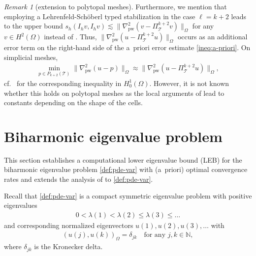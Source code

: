 \documentclass[a4paper]{amsart}
\numberwithin{equation}{section}
\def\pw{\mathrm{pw}}
\theoremstyle{definition}
\theoremstyle{remark}
\newtheorem{remark}[theorem]{Remark}
\numberwithin{theorem}{section}
\numberwithin{equation}{section}
\numberwithin{table}{section}
\numberwithin{figure}{section}
\begin{document}
\begin{remark}[extension to polytopal meshes]
    Furthermore, we mention that employing a Lehrenfeld-Sch\"oberl typed stabilization in the case $\ell = k+2$ leads to the upper bound $s_h(I_h v, I_h v) \lesssim \|\nabla_\pw^2(v - \Pi_{\mathcal{T}}^{k+2} v)\|_{\Omega}$ for any $v \in H^2(\Omega)$ instead of . Thus, $\|\nabla_\pw^2(u - \Pi_{\mathcal{T}}^{k+2} u)\|_{\Omega}$ occurs as an additional error term on the right-hand side of the a~priori error estimate \eqref{ineq:a-priori}. On simplicial meshes,
    \begin{align*}
         \min_{p \in P_{k+2}(\mathcal{T})} \|\nabla^2_\pw(u - p)\|_\Omega \approx \|\nabla_\pw^2(u - \Pi_{\mathcal{T}}^{k+2} u)\|_{\Omega},
    \end{align*}
    cf.~\cite[Theorem 3.1]{CarstensenZhaiZhang2020} for the corresponding inequality in $H^1_0(\Omega)$. However, it is not known whether this holds on polytopal meshes as the local arguments of \cite{CarstensenZhaiZhang2020} lead to constants depending on the shape of the cells.
\end{remark}

\section{Biharmonic eigenvalue problem}\label{sec:eigenvalue_problem}
This section establishes a computational lower eigenvalue bound (LEB) for the biharmonic eigenvalue problem \eqref{def:pde-var} with (a~priori) optimal convergence rates and extends the analysis of  to \eqref{def:pde-var}.

Recall that \eqref{def:pde-var} is a compact symmetric eigenvalue problem with positive eigenvalues
\begin{align*}
	0 < \lambda(1) < \lambda(2) \leq \lambda(3) \leq \dots
\end{align*}
and corresponding normalized eigenvectors $u(1), u(2), u(3), \dots$ with 
\begin{align*}
	(u(j), u(k))_\Omega = \delta_{jk} \quad\text{for any } j,k \in \mathbb{N},
\end{align*}
where $\delta_{jk}$ is the Kronecker delta.
\end{document}
